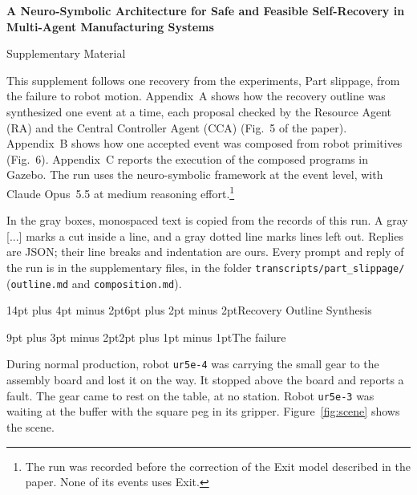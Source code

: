\documentclass[preprint,12pt,authoryear]{elsarticle}
\makeatletter
\newcommand{\papertitle}{A Neuro-Symbolic Architecture for Safe and Feasible Self-Recovery in Multi-Agent Manufacturing Systems}
\newcommand{\FigOutline}{Fig.~5}
\newcommand{\FigComposition}{Fig.~6}
\renewcommand\section{\@startsection{section}{1}{\z@}%
  {14pt plus 4pt minus 2pt}{6pt plus 2pt minus 2pt}{\large\bfseries\boldmath}}
\renewcommand\subsection{\@startsection{subsection}{2}{\z@}%
  {9pt plus 3pt minus 2pt}{2pt plus 1pt minus 1pt}{\normalsize\bfseries}}
\newcommand{\cut}{{\normalfont\ttfamily\color{cutgray}[...]}}
\let\code\nolinkurl
\makeatother
\begin{document}
\begin{center}
  {\Large\bfseries \papertitle\par}
  \medskip
  {\large Supplementary Material\par}
\end{center}

This supplement follows one recovery from the experiments, Part slippage, from the failure to
robot motion. Appendix~A shows how the recovery outline was synthesized one event at a time,
each proposal checked by the Resource Agent (RA) and the Central Controller Agent (CCA)
(\FigOutline{} of the paper). Appendix~B shows how one accepted event was composed from robot
primitives (\FigComposition). Appendix~C reports the execution of the composed programs in
Gazebo. The run uses the neuro-symbolic framework at the event level, with Claude Opus~5.5 at
medium reasoning effort.\footnote{The run was recorded before the correction of the Exit model
described in the paper. None of its events uses Exit.}

In the gray boxes, monospaced text is copied from the records of this run. A gray
\cut{} marks a cut inside a line, and a gray dotted line marks lines left out. Replies are
JSON; their line breaks and indentation are ours. Every prompt and reply of the run is in the
supplementary files, in the folder \code{transcripts/part_slippage/} (\code{outline.md} and
\code{composition.md}).

\appendix
\makeatletter
{}
\makeatother
\renewcommand{\theHtable}{\Alph{section}.\arabic{table}}
\renewcommand{\theHfigure}{\Alph{section}.\arabic{figure}}

\section{Recovery Outline Synthesis}\label{sec:outline}

\subsection{The failure}

During normal production, robot \code{ur5e-4} was carrying the small gear to the assembly
board and lost it on the way. It stopped above the board and reports a fault. The gear came to
rest on the table, at no station. Robot \code{ur5e-3} was waiting at the buffer with the square
peg in its gripper. Figure~\ref{fig:scene} shows the scene.
\end{document}
